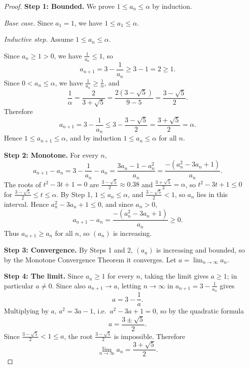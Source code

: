 \documentclass[11pt]{article}
\begin{document}
\begin{proof}

\textbf{Step 1: Bounded.} We prove $1\le a_n\le\alpha$ by induction.

\emph{Base case.} Since $a_1=1$, we have $1\le a_1\le\alpha$.

\emph{Inductive step.} Assume $1\le a_n\le\alpha$.

Since $a_n\ge1>0$, we have $\frac1{a_n}\le1$, so
\[
  a_{n+1} = 3-\frac1{a_n} \ge 3-1 = 2 \ge 1 .
\]
Since $0<a_n\le\alpha$, we have $\frac1{a_n}\ge\frac1\alpha$, and
\[
  \frac1\alpha = \frac{2}{3+\sqrt5} = \frac{2(3-\sqrt5)}{9-5} = \frac{3-\sqrt5}{2}.
\]
Therefore
\[
  a_{n+1} = 3-\frac1{a_n} \le 3-\frac{3-\sqrt5}{2} = \frac{3+\sqrt5}{2} = \alpha .
\]
Hence $1\le a_{n+1}\le\alpha$, and by induction $1\le a_n\le\alpha$ for all $n$.

\textbf{Step 2: Monotone.}
For every $n$,
\[
  a_{n+1}-a_n = 3-\frac1{a_n}-a_n = \frac{3a_n-1-a_n^2}{a_n}
  = \frac{-(a_n^2-3a_n+1)}{a_n}.
\]
The roots of $t^2-3t+1=0$ are $\frac{3-\sqrt5}{2}\approx0.38$ and
$\frac{3+\sqrt5}{2}=\alpha$, so $t^2-3t+1\le0$ for
$\frac{3-\sqrt5}{2}\le t\le\alpha$. By Step 1, $1\le a_n\le\alpha$, and
$\frac{3-\sqrt5}{2}<1$, so $a_n$ lies in this interval. Hence
$a_n^2-3a_n+1\le0$, and since $a_n>0$,
\[
  a_{n+1}-a_n = \frac{-(a_n^2-3a_n+1)}{a_n} \ge 0 .
\]
Thus $a_{n+1}\ge a_n$ for all $n$, so $(a_n)$ is increasing.

\textbf{Step 3: Convergence.}
By Steps 1 and 2, $(a_n)$ is increasing and bounded, so by the Monotone
Convergence Theorem it converges. Let $a=\displaystyle\lim_{n\to\infty}a_n$.

\textbf{Step 4: The limit.}
Since $a_n\ge1$ for every $n$, taking the limit gives $a\ge1$; in particular
$a\neq0$. Since also $a_{n+1}\to a$, letting $n\to\infty$ in
$a_{n+1}=3-\frac1{a_n}$ gives
\[
  a = 3-\frac1a .
\]
Multiplying by $a$, $a^2=3a-1$, i.e.\ $a^2-3a+1=0$, so by the quadratic formula
\[
  a = \frac{3\pm\sqrt5}{2}.
\]
Since $\frac{3-\sqrt5}{2}<1\le a$, the root $\frac{3-\sqrt5}{2}$ is impossible.
Therefore
\[
  \lim_{n\to\infty}a_n = \frac{3+\sqrt5}{2}.
\]

\end{proof}
\end{document}
